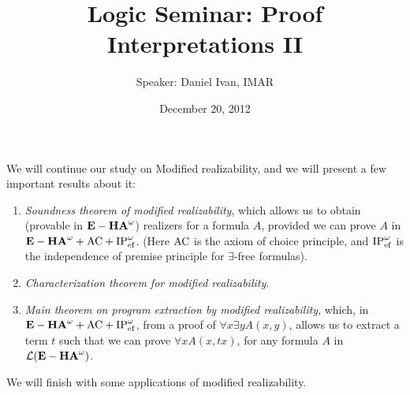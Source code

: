 \documentclass[a4paper,12pt]{article}
\title{Logic Seminar: Proof Interpretations II}
\author{Speaker: Daniel Ivan, IMAR}
\date{December 20, 2012}
\begin{document}
\maketitle
 We will continue our study on Modified realizability, and we will present a few important results about it:
\begin{enumerate}
 \item  \emph{Soundness theorem of modified realizability}, which allows us to obtain (provable in ${\bf E-HA}^\omega$) realizers for a formula $A$, provided we can prove $A$ in ${\bf E-HA}^\omega +{\rm AC} +{\rm IP}^\omega_{\rm ef}$. (Here ${\rm AC}$ is the axiom of choice principle, and ${\rm IP}^\omega_{\rm ef}$ is the independence of premise principle for $\exists$-free formulas).
 \item \emph{Characterization theorem for modified realizability}.
 \item \emph{Main theorem on program extraction by modified realizability}, which, in ${\bf E-HA}^\omega+{\rm AC}+{\rm IP}^\omega_{\rm ef}$, from a proof of $\forall x \exists y A(x,y)$, allows us to extract a term $t$ such that we can prove $\forall x  A(x,tx)$, for any formula $A$ in $\mathcal{L}({\bf E-HA}^\omega)$. 
\end{enumerate}
We will finish with some applications of modified realizability.
\end{document}
